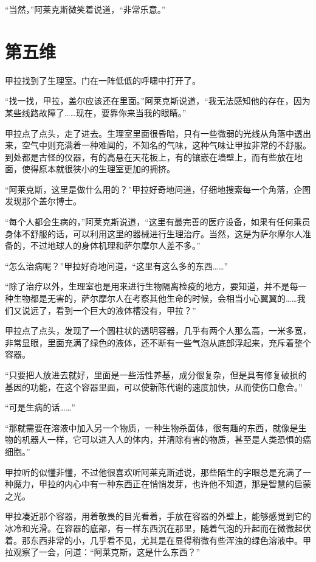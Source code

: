 “当然，”阿莱克斯微笑着说道，“非常乐意。” 

\chapter{第五维}

甲拉找到了生理室。门在一阵低低的呼啸中打开了。 

“找一找，甲拉，盖尔应该还在里面。”阿莱克斯说道，“我无法感知他的存在，因为某些线路故障了……现在，要靠你来当我的眼睛。” 

甲拉点了点头，走了进去。生理室里面很昏暗，只有一些微弱的光线从角落中透出来，空气中则充满着一种难闻的，不知名的气味，这种气味让甲拉非常的不舒服。到处都是古怪的仪器，有的高悬在天花板上，有的镶嵌在墙壁上，而有些放在地面，使得原本就很狭小的生理室更加的拥挤。 

“阿莱克斯，这里是做什么用的？”甲拉好奇地问道，仔细地搜索每一个角落，企图发现那个盖尔博士。 

“每个人都会生病的，”阿莱克斯说道，“这里有最完善的医疗设备，如果有任何乘员身体不舒服的话，可以利用这里的器械进行生理治疗。当然，这是为萨尔摩尔人准备的，不过地球人的身体机理和萨尔摩尔人差不多。” 

“怎么治病呢？”甲拉好奇地问道，“这里有这么多的东西……” 

“除了治疗以外，生理室也是用来进行生物隔离检疫的地方，要知道，并不是每一种生物都是无害的，萨尔摩尔人在考察其他生命的时候，会相当小心翼翼的……我们又说远了，看到一个巨大的液体槽没有，甲拉？” 

甲拉点了点头，发现了一个圆柱状的透明容器，几乎有两个人那么高，一米多宽，非常显眼，里面充满了绿色的液体，还不断有一些气泡从底部浮起来，充斥着整个容器。 

“只要把人放进去就好，里面是一些活性养基，成分很复杂，但是具有修复破损的基因的功能，在这个容器里面，可以使新陈代谢的速度加快，从而使伤口愈合。” 

“可是生病的话……” 

“那就需要在溶液中加入另一个物质，一种生物杀菌体，很有趣的东西，就像是生物的机器人一样，它可以进入人的体内，并清除有害的物质，甚至是人类恐惧的癌细胞。” 

甲拉听的似懂非懂，不过他很喜欢听阿莱克斯述说，那些陌生的字眼总是充满了一种魔力，甲拉的内心中有一种东西正在悄悄发芽，也许他不知道，那是智慧的启蒙之光。 

甲拉凑近那个容器，用着敬畏的目光看着，手放在容器的外壁上，能够感觉到它的冰冷和光滑。在容器的底部，有一样东西沉在那里，随着气泡的升起而在微微起伏着。那东西非常的小，几乎看不见，尤其是在显得稍微有些浑浊的绿色溶液中。甲拉观察了一会，问道：“阿莱克斯，这是什么东西？” 

